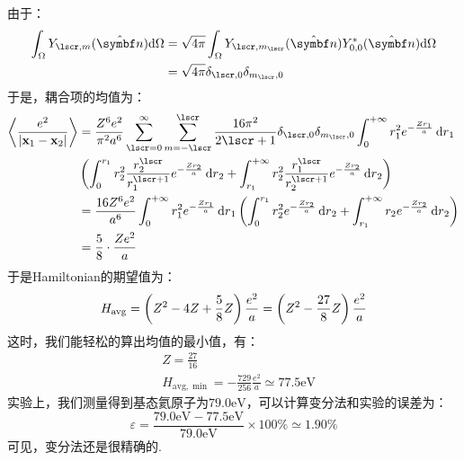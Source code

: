 由于：
\begin{align*}
\int_{\Omega}Y_{\lscr,m}(\uv{n})\dd\Omega
& = \sqrt{4\pi}\int_{\Omega}Y_{\lscr,m_{\lscr}}(\uv{n})Y^{*}_{0,0}(\uv{n})\dd\Omega \\
& = \sqrt{4\pi}\delta_{\lscr,0}\delta_{m_{\lscr},0}
\end{align*}
于是，耦合项的均值为：
\begin{align*}
\avg{\frac{e^{2}}{\abs{\vr_{1} - \vr_{2}}}}
& = \frac{Z^{6}e^{2}}{\pi^{2}a^{6}}\sum_{\lscr=0}^{\infty}\sum_{m=-\lscr}^{\lscr}\frac{16\pi^{2}}{2\lscr+1}\delta_{\lscr,0}\delta_{m_{\lscr},0}\int_{0}^{+\infty}r_{1}^{2}e^{-\frac{Zr_{1}}{a}}\dd{r}_{1} \\
& \br{\int_{0}^{r_{1}}r_{2}^{2}\frac{r_{2}^{\lscr}}{r_{1}^{\lscr+1}}e^{-\frac{Zr_{2}}{a}}\dd{r}_{2} + \int_{r_{1}}^{+\infty}r_{2}^{2}\frac{r_{1}^{\lscr}}{r_{2}^{\lscr+1}}e^{-\frac{Zr_{2}}{a}}\dd{r}_{2}} \\
& = \frac{16Z^{6}e^{2}}{a^{6}}\int_{0}^{+\infty}r_{1}^{2}e^{-\frac{Zr_{1}}{a}}\dd{r}_{1}\br{\int_{0}^{r_{1}}r_{2}^{2}e^{-\frac{Zr_{2}}{a}}\dd{r}_{2} + \int_{r_{1}}^{+\infty}r_{2}e^{-\frac{Zr_{2}}{a}}\dd{r}_{2}} \\
& = \frac{5}{8}\cdot\frac{Ze^{2}}{a}
\end{align*}
于是Hamiltonian的期望值为：
\[
H_{\mathrm{avg}} = \left({Z^{2} - 4Z + \frac{5}{8}Z}\right)\frac{e^{2}}{a} = \left({Z^{2} - \frac{27}{8}Z}\right)\frac{e^{2}}{a}
\]
这时，我们能轻松的算出均值的最小值，有：
\begin{align*}
& Z = \frac{27}{16} \\
& H_{\mathrm{avg},\min} = -\frac{729}{256}\frac{e^{2}}{a} \simeq 77.5\mathrm{eV}
\end{align*}
实验上，我们测量得到基态氦原子为\(79.0\mathrm{eV}\)，可以计算变分法和实验的误差为：
\[
\varepsilon = \frac{79.0\mathrm{eV} - 77.5\mathrm{eV}}{79.0\mathrm{eV}}\times 100\% \simeq 1.90\%
\]
可见，变分法还是很精确的. 